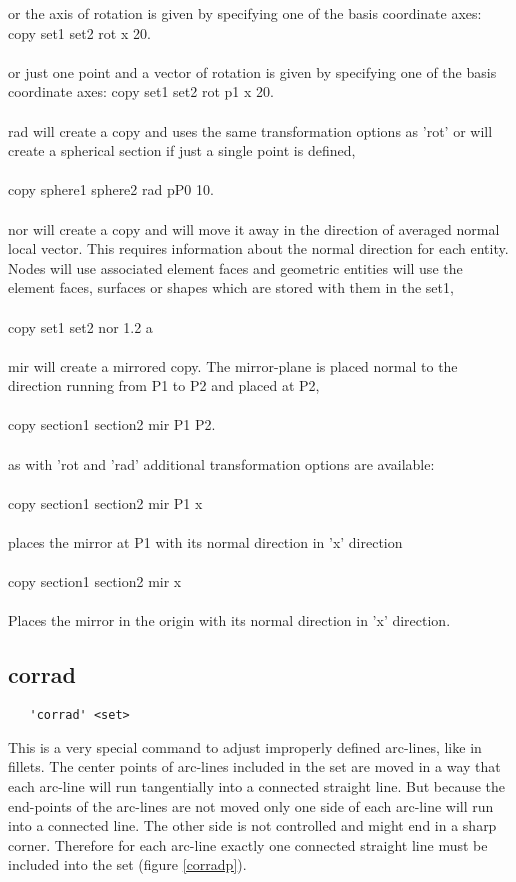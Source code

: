 \documentclass{article}
\begin{document}
or the axis of rotation is given by specifying one of the basis coordinate axes:
copy set1 set2 rot x 20.\\\\
or just one point and a vector of rotation is given by specifying one of the basis coordinate axes:
copy set1 set2 rot p1 x 20.\\\\
rad will create a copy and uses the same transformation options as 'rot' or will create a spherical section if just a single point is defined,\\\\
copy sphere1 sphere2 rad pP0 10.\\\\
nor will create a copy and will move it away in the direction of averaged normal local vector. This requires information about the normal direction for each entity. Nodes will use associated element faces and geometric entities will use the element faces, surfaces or shapes which are stored with them in the set1,\\\\
copy set1 set2 nor 1.2 a\\\\
mir will create a mirrored copy. The mirror-plane is placed normal to the direction running from P1 to P2 and placed at P2,\\\\
copy section1 section2 mir P1 P2.\\\\
as with 'rot and 'rad' additional transformation options are available:\\\\
copy section1 section2 mir P1 x\\\\
places the mirror at P1 with its normal direction in 'x' direction\\\\
copy section1 section2 mir x\\\\
Places the mirror in the origin with its normal direction in 'x' direction.

\subsection{\label{corrad}corrad}
\begin{verbatim}
   'corrad' <set>
\end{verbatim}
This is a very special command to adjust improperly defined arc-lines, like in fillets. The center points of arc-lines included in the set are moved in a way that each arc-line will run tangentially into a connected straight line. But because the end-points of the arc-lines are not moved only one side of each arc-line will run into a connected line. The other side is not controlled and might end in a sharp corner. Therefore for each arc-line exactly one connected straight line must be included into the set (figure \ref{corradp}).
\end{document}
